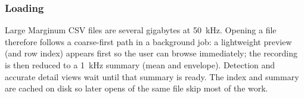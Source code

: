 \subsubsection{Loading}
\label{sec:vis-loading}
Large Marginum CSV files are several gigabytes at \SI{50}{\kilo\hertz}. Opening a file
therefore follows a coarse-first path in a background job: a lightweight preview (and row
index) appears first so the user can browse immediately; the recording is then reduced to a
\SI{1}{\kilo\hertz} summary (mean and envelope). Detection and accurate detail views wait
until that summary is ready. The index and summary are cached on disk so later opens of the
same file skip most of the work.
